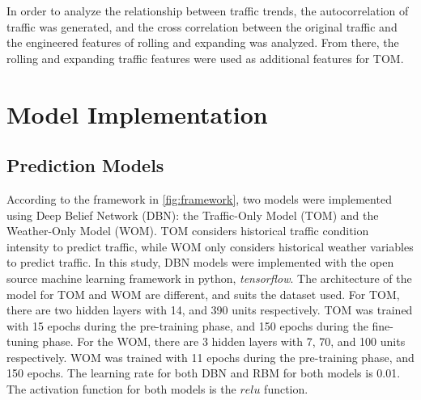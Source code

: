 In order to analyze the relationship between traffic trends, the autocorrelation of traffic was generated, and the cross correlation between the original traffic and the engineered features of rolling and expanding was analyzed. From there, the rolling and expanding traffic features were used as additional features for TOM. 



































































\section{Model Implementation}
\subsection{Prediction Models}
According to the framework in \ref{fig:framework}, two models were implemented using Deep Belief Network (DBN): the Traffic-Only Model (TOM) and the Weather-Only Model (WOM). TOM considers historical traffic condition intensity to predict traffic, while WOM only considers historical weather variables to predict traffic. In this study, DBN models were implemented with the open source machine learning framework in python, \textit{tensorflow}. The architecture of the model for TOM and WOM are different, and suits the dataset used. For TOM, there are two hidden layers with 14, and 390 units respectively. TOM was trained with 15 epochs during the pre-training phase, and 150 epochs during the fine-tuning phase. For the WOM, there are 3 hidden layers with 7, 70, and 100 units respectively. WOM was trained with 11 epochs during the pre-training phase, and 150 epochs. The learning rate for both DBN and RBM for both models is 0.01. The activation function for both models is the $relu$ function. 

